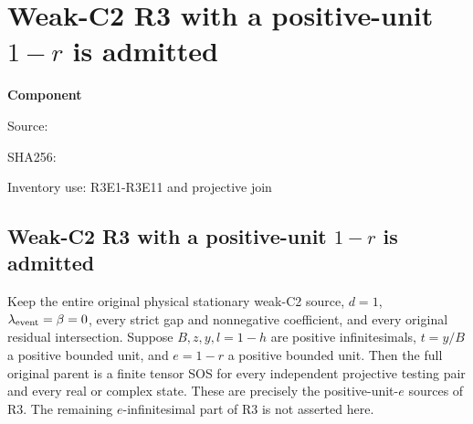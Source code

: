 \chapter{Weak-C2 R3 with a positive-unit $1-r$ is admitted}
\label{component:p1c9902e9a6f2}
\noindent\textbf{Component }\par
{\small\noindent Source: \par}
{\small\noindent SHA256: \par}
{\small\noindent Inventory use: R3E1-R3E11 and projective join\par}
\medskip
\section{Weak-C2 R3 with a positive-unit $1-r$ is admitted}
\label{p1c9902e9a6f2:sec:r18-r3-eunit}

\begin{theorem}
Keep the entire original physical stationary weak-C2 source, $d=1$,
$\lambda_{\rm event}=\beta=0$, every strict gap and nonnegative
coefficient, and every original residual intersection. Suppose
$B,z,y,l=1-h$ are positive infinitesimals, $t=y/B$ a positive bounded
unit, and $e=1-r$ a positive bounded unit. Then the full original
parent is a finite tensor SOS for every independent projective testing
pair and every real or complex state. These are precisely the
positive-unit-$e$ sources of R3. The remaining $e$-infinitesimal
part of R3 is not asserted here.
\end{theorem}

